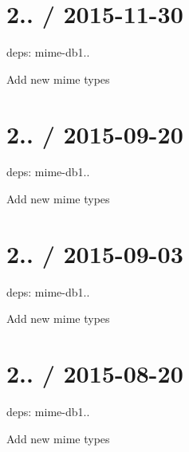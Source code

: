 \section*{2.. / 2015-\/11-\/30 }


\begin{DoxyItemize}
\item deps\+: mime-\/db1..
\begin{DoxyItemize}
\item Add new mime types
\end{DoxyItemize}
\end{DoxyItemize}

\section*{2.. / 2015-\/09-\/20 }


\begin{DoxyItemize}
\item deps\+: mime-\/db1..
\begin{DoxyItemize}
\item Add new mime types
\end{DoxyItemize}
\end{DoxyItemize}

\section*{2.. / 2015-\/09-\/03 }


\begin{DoxyItemize}
\item deps\+: mime-\/db1..
\begin{DoxyItemize}
\item Add new mime types
\end{DoxyItemize}
\end{DoxyItemize}

\section*{2.. / 2015-\/08-\/20 }


\begin{DoxyItemize}
\item deps\+: mime-\/db1..
\begin{DoxyItemize}
\item Add new mime types
\end{DoxyItemize}
\end{DoxyItemize}

